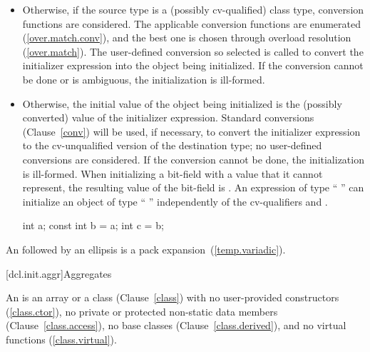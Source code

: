 \begin{itemize}
\item
Otherwise, if the source type
is a (possibly cv-qualified) class type, conversion functions are
considered.
The applicable conversion functions are enumerated
(\ref{over.match.conv}), and the best one is chosen through overload
resolution (\ref{over.match}).
The user-defined conversion so selected
is called to convert the initializer expression into the
object being initialized.
If the conversion cannot be done or is
ambiguous, the initialization is ill-formed.
\item
Otherwise, the initial value of the object being initialized is
the (possibly converted) value of the initializer expression.
Standard conversions (Clause~\ref{conv}) will be used, if necessary,
to convert the initializer expression to the cv-unqualified version of
the destination type;
no user-defined conversions are considered.
If the conversion cannot
be done, the initialization is ill-formed.
When initializing a bit-field with a value that it cannot represent, the
resulting value of the bit-field is
.
%
\enternote
An expression of type
`` ''
can initialize an object of type
`` ''
independently of
the cv-qualifiers
and .

\begin{codeblock}
int a;
const int b = a;
int c = b;
\end{codeblock}
\exitnote
\end{itemize}

\pnum
An  followed by an ellipsis is a
pack expansion~(\ref{temp.variadic}).

[dcl.init.aggr]{Aggregates}%
%
%
%
%
%
%

\pnum
An
is an array or a class (Clause~\ref{class}) with no
user-provided constructors (\ref{class.ctor}),
no private or protected non-static data members (Clause~\ref{class.access}),
no base classes (Clause~\ref{class.derived}),
and no virtual functions (\ref{class.virtual}).

